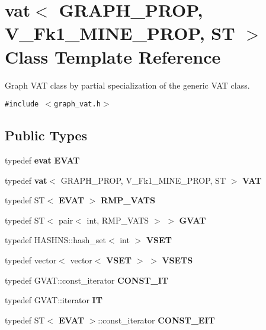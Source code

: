 \section{vat$<$ GRAPH\_\-PROP, V\_\-Fk1\_\-MINE\_\-PROP, ST $>$ Class Template Reference}
\label{classvat_3_01GRAPH__PROP_00_01V__Fk1__MINE__PROP_00_01ST_01_4}
Graph VAT class by partial specialization of the generic VAT class.  


{\tt \#include $<$graph\_\-vat.h$>$}

\subsection*{Public Types}
\begin{CompactItemize}
\item 
typedef {\bf evat} {\bf EVAT}\label{classvat_3_01GRAPH__PROP_00_01V__Fk1__MINE__PROP_00_01ST_01_4_w0}

\item 
typedef {\bf vat}$<$ GRAPH\_\-PROP, V\_\-Fk1\_\-MINE\_\-PROP, ST $>$ {\bf VAT}\label{classvat_3_01GRAPH__PROP_00_01V__Fk1__MINE__PROP_00_01ST_01_4_w1}

\item 
typedef ST$<$ {\bf EVAT} $>$ {\bf RMP\_\-VATS}\label{classvat_3_01GRAPH__PROP_00_01V__Fk1__MINE__PROP_00_01ST_01_4_w2}

\item 
typedef ST$<$ pair$<$ int, RMP\_\-VATS $>$ $>$ {\bf GVAT}
\item 
typedef HASHNS::hash\_\-set$<$ int $>$ {\bf VSET}
\item 
typedef vector$<$ vector$<$ {\bf VSET} $>$ $>$ {\bf VSETS}
\item 
typedef GVAT::const\_\-iterator {\bf CONST\_\-IT}\label{classvat_3_01GRAPH__PROP_00_01V__Fk1__MINE__PROP_00_01ST_01_4_w6}

\item 
typedef GVAT::iterator {\bf IT}\label{classvat_3_01GRAPH__PROP_00_01V__Fk1__MINE__PROP_00_01ST_01_4_w7}

\item 
typedef ST$<$ {\bf EVAT} $>$::const\_\-iterator {\bf CONST\_\-EIT}\label{classvat_3_01GRAPH__PROP_00_01V__Fk1__MINE__PROP_00_01ST_01_4_w8}

\end{CompactItemize}
